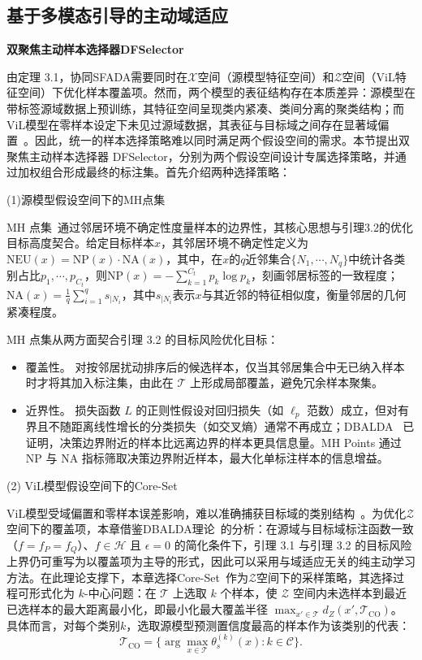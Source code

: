 \subsection{基于多模态引导的主动域适应}

\noindent\textbf{双聚焦主动样本选择器DFSelector}

由定理 3.1，协同SFADA需要同时在$\mathcal{X}$空间（源模型特征空间）和$\mathcal{Z}$空间（ViL特征空间）下优化样本覆盖项。然而，两个模型的表征结构存在本质差异：源模型在带标签源域数据上预训练，其特征空间呈现类内紧凑、类间分离的聚类结构；而ViL模型在零样本设定下未见过源域数据，其表征与目标域之间存在显著域偏置~\cite{ge2023domain,tang2024source}。因此，统一的样本选择策略难以同时满足两个假设空间的需求。本节提出双聚焦主动样本选择器 DFSelector，分别为两个假设空间设计专属选择策略，并通过加权组合形成最终的标注集。首先介绍两种选择策略：

(1)源模型假设空间下的MH点集

MH 点集~\cite{wang2023mhpl}通过邻居环境不确定性度量样本的边界性，其核心思想与引理3.2的优化目标高度契合。给定目标样本$x$，其邻居环境不确定性定义为$\mathrm{NEU}(x)=\mathrm{NP}(x)\cdot\mathrm{NA}(x)$，其中，在$x$的$q$近邻集合$\{N_1,\cdots,N_q\}$中统计各类别占比$p_1,\cdots,p_{C_t}$，则$\mathrm{NP}(x)=-\sum_{k=1}^{C_t}p_k\log p_k$，刻画邻居标签的一致程度；$\mathrm{NA}(x)=\frac{1}{q}\sum_{i=1}^{q}s_{|N_i}$，其中$s_{|N_i}$表示$x$与其近邻的特征相似度，衡量邻居的几何紧凑程度。

MH 点集从两方面契合引理 3.2 的目标风险优化目标：

\begin{itemize}
    \item 覆盖性。 对按邻居扰动排序后的候选样本，仅当其邻居集合中无已纳入样本时才将其加入标注集，由此在 $\mathcal{T}$ 上形成局部覆盖，避免冗余样本聚集。
    \item 近界性。 损失函数 $L$ 的正则性假设对回归损失（如 $\ell_p$ 范数）成立，但对有界且不随距离线性增长的分类损失（如交叉熵）通常不再成立；DBALDA~\cite{mathelin2022discrepancy} 已证明，决策边界附近的样本比远离边界的样本更具信息量。MH Points 通过 NP 与 NA 指标筛取决策边界附近样本，最大化单标注样本的信息增益。
\end{itemize}


(2) ViL模型假设空间下的Core-Set

ViL模型受域偏置和零样本误差影响，难以准确捕获目标域的类别结构~\cite{ge2023domain,tang2024source}。为优化$\mathcal{Z}$空间下的覆盖项，本章借鉴DBALDA理论~\cite{mathelin2022discrepancy}的分析：在源域与目标域标注函数一致（$f=f_P=f_Q$）、$f\in\mathcal{H}$ 且 $\epsilon=0$ 的简化条件下，引理 3.1 与引理 3.2 的目标风险上界仍可重写为以覆盖项为主导的形式，因此可以采用与域适应无关的纯主动学习方法。在此理论支撑下，本章选择Core-Set~\cite{prabhu2021active}作为$\mathcal{Z}$空间下的采样策略，其选择过程可形式化为 $k$-中心问题：在 $\mathcal{T}$ 上选取 $k$ 个样本，使 $\mathcal{Z}$ 空间内未选样本到最近已选样本的最大距离最小化，即最小化最大覆盖半径 $\max_{x'\in\mathcal{T}}d_Z(x',\mathcal{T}_{\text{CO}})$。
具体而言，对每个类别$k$，选取源模型预测置信度最高的样本作为该类别的代表：
\begin{equation}
\mathcal{T}_{\text{CO}} = \{\arg\max_{x\in\mathcal{T}}\theta_s^{(k)}(x) : k\in\mathcal{C}\}.
\end{equation}

